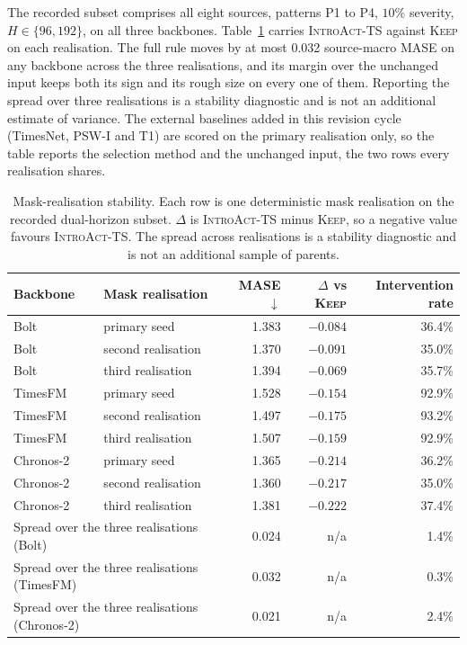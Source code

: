 \documentclass{article}
\newcommand{\introact}{\textsc{IntroAct-TS}}
\begin{document}
The recorded subset comprises all eight sources, patterns P1 to P4, $10\%$ severity,
$H \in \{96,192\}$, on all three backbones. Table~\ref{tab:app-seeds} carries \introact{}
against \textsc{Keep} on each realisation. The full rule moves by at most 0.032 source-macro
MASE on any backbone across the three realisations, and its margin over the unchanged input
keeps both its sign and its rough size on every one of them. Reporting the spread over three
realisations is a stability diagnostic and is not an additional estimate of variance. The
external baselines added in this revision cycle (TimesNet, PSW-I and T1) are scored on the
primary realisation only, so the table reports the selection method and the unchanged
input, the two rows every realisation shares.

\begin{table}[htbp]
  \caption{Mask-realisation stability. Each row is one deterministic mask realisation on the
  recorded dual-horizon subset. $\Delta$ is \introact{} minus \textsc{Keep}, so a negative
  value favours \introact{}. The spread across realisations is a stability diagnostic and is not
  an additional sample of parents.}
  \label{tab:app-seeds}
  \centering
  \small
  \setlength{\tabcolsep}{4pt}
\begin{tabular*}{\textwidth}{@{\extracolsep{\fill}}llrrr@{}}
    \toprule
    Backbone & Mask realisation & MASE $\downarrow$ & $\Delta$ vs \textsc{Keep} & Intervention rate \\
    \midrule
    Bolt      & primary seed        & 1.383 & $-0.084$ & 36.4\% \\
    Bolt      & second realisation  & 1.370 & $-0.091$ & 35.0\% \\
    Bolt      & third realisation   & 1.394 & $-0.069$ & 35.7\% \\
    \midrule
    TimesFM   & primary seed        & 1.528 & $-0.154$ & 92.9\% \\
    TimesFM   & second realisation  & 1.497 & $-0.175$ & 93.2\% \\
    TimesFM   & third realisation   & 1.507 & $-0.159$ & 92.9\% \\
    \midrule
    Chronos-2 & primary seed        & 1.365 & $-0.214$ & 36.2\% \\
    Chronos-2 & second realisation  & 1.360 & $-0.217$ & 35.0\% \\
    Chronos-2 & third realisation   & 1.381 & $-0.222$ & 37.4\% \\
    \midrule
    \multicolumn{2}{l}{Spread over the three realisations (Bolt)}      & 0.024 & n/a & 1.4\% \\
    \multicolumn{2}{l}{Spread over the three realisations (TimesFM)}   & 0.032 & n/a & 0.3\% \\
    \multicolumn{2}{l}{Spread over the three realisations (Chronos-2)} & 0.021 & n/a & 2.4\% \\
    \bottomrule
  \end{tabular*}
\end{table}
\end{document}
